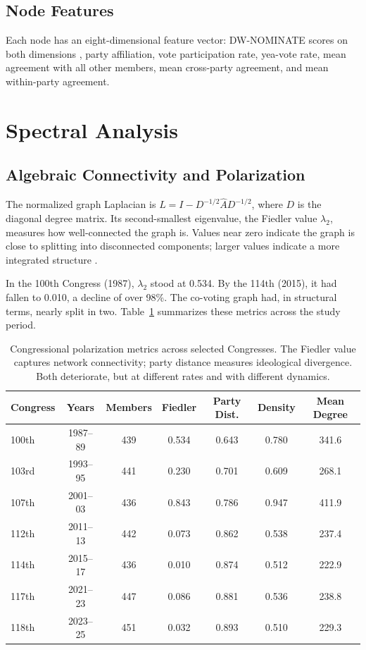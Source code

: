 \documentclass[12pt, a4paper]{article}
\begin{document}
\subsection{Node Features}

Each node has an eight-dimensional feature vector: DW-NOMINATE scores on both dimensions \citep{poole2017}, party affiliation, vote participation rate, yea-vote rate, mean agreement with all other members, mean cross-party agreement, and mean within-party agreement.

\section{Spectral Analysis}

\subsection{Algebraic Connectivity and Polarization}

The normalized graph Laplacian is $L = I - D^{-1/2} \hat{A} D^{-1/2}$, where $D$ is the diagonal degree matrix. Its second-smallest eigenvalue, the Fiedler value $\lambda_2$, measures how well-connected the graph is. Values near zero indicate the graph is close to splitting into disconnected components; larger values indicate a more integrated structure \citep{fiedler1973}.

In the 100th Congress (1987), $\lambda_2$ stood at 0.534. By the 114th (2015), it had fallen to 0.010, a decline of over 98\%. The co-voting graph had, in structural terms, nearly split in two. Table~\ref{tab:polarization} summarizes these metrics across the study period.

\begin{table}[!htbp]
\centering
\caption{Congressional polarization metrics across selected Congresses. The Fiedler value captures network connectivity; party distance measures ideological divergence. Both deteriorate, but at different rates and with different dynamics.}
\label{tab:polarization}
\begin{tabular}{lcccccc}
\toprule
Congress & Years & Members & Fiedler & Party Dist. & Density & Mean Degree \\
\midrule
100th & 1987--89 & 439 & 0.534 & 0.643 & 0.780 & 341.6 \\
103rd & 1993--95 & 441 & 0.230 & 0.701 & 0.609 & 268.1 \\
107th & 2001--03 & 436 & 0.843 & 0.786 & 0.947 & 411.9 \\
112th & 2011--13 & 442 & 0.073 & 0.862 & 0.538 & 237.4 \\
114th & 2015--17 & 436 & 0.010 & 0.874 & 0.512 & 222.9 \\
117th & 2021--23 & 447 & 0.086 & 0.881 & 0.536 & 238.8 \\
118th & 2023--25 & 451 & 0.032 & 0.893 & 0.510 & 229.3 \\
\bottomrule
\end{tabular}
\end{table}
\end{document}
